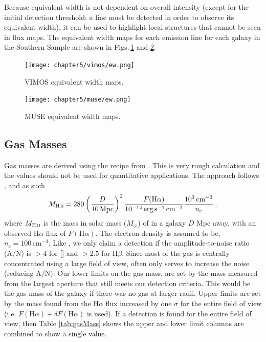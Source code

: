 		Because equivalent width is not dependent on overall intensity (except for the initial detection threshold: a line must be detected in order to observe its equivalent width), it can be used to highlight local structures that cannot be seen in flux maps. The equivalent width maps for each emission line for each galaxy in the Southern Sample are shown in Figs.\,\ref{fig:VIMOS_ew} and \ref{fig:MUSE_ew}. 

		\begin{figure}
			\centering
			\texttt{[image: chapter5/vimos/ew.png]}
			\caption[VIMOS equivalent width maps]{VIMOS equivalent width maps.} 
			\label{fig:VIMOS_ew}
		\end{figure}
		\begin{figure}
			\centering
			\texttt{[image: chapter5/muse/ew.png]}
			\caption[MUSE equivalent width maps]{MUSE equivalent width maps.} 
			\label{fig:MUSE_ew}
		\end{figure}

	\subsection{Gas Masses}
		\label{subsec:GasMass}

		Gas masses are derived using the recipe from \citet{Sarzi2005}. This is very rough calculation and the values should not be used for quantitative applications. The approach follows \citet{Kim1989}, and as such
		\begin{equation}
			M_\text{\ion{H}{ii}} = 280 \left(\frac{D}{10\, \mathrm{Mpc}}\right)^2 \frac{F(\mathrm{H\alpha})}{10^{-14} \, \mathrm{erg \, s^{-1} \, cm^{-2}}} \frac{10^3 \, \mathrm{cm^{-3}}}{n_\mathrm{e}} \, ,
		\end{equation}
		where $M_\text{\ion{H}{ii}}$ is the mass in solar mass ($M_\odot$) of  in a galaxy $D$ Mpc away, with an observed H$\alpha$ flux of $F(\mathrm{H\alpha})$. The electron density is assumed to be, $n_\mathrm{e} = 100 \, \mathrm{cm^{-3}}$. 
		Like \citet{Sarzi2005}, we only claim a detection if the amplitude-to-noise ratio (A/N) is $>4$ for [] and $>2.5$ for H$\beta$. Since most of the gas is centrally concentrated using a large field of view, often only serves to increase the noise (reducing A/N). Our lower limits on the gas mass, are set by the mass measured from the largest aperture that still meets our detection criteria. This would be the gas mass of the galaxy if there was no gas at larger radii. Upper limits are set by the mass found from the H$\alpha$ flux increased by one $\sigma$ for the entire field of view (i.e. $F(\mathrm{H\alpha})+\delta F(\mathrm{H\alpha})$ is used). If a detection is found for the entire field of view, then Table \ref{tab:gasMass} shows the upper and lower limit columns are combined to show a single value. 


